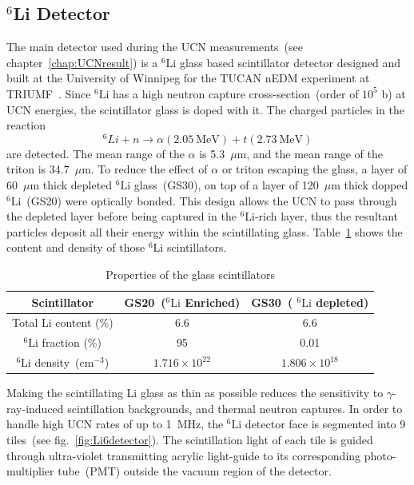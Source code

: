 \subsection{$^6$Li Detector\label{sec:Li6detector}}
The main detector used during the UCN measurements~(see
chapter~\ref{chap:UCNresult}) is a $^6\mathrm{Li}$ glass based
scintillator detector designed and built at the University of Winnipeg
for the TUCAN nEDM experiment at
TRIUMF~\cite{jamieson2017characterization, Lori}. Since
$^6\mathrm{Li}$ has a high neutron capture cross-section~(order of
$10^5$ b) at UCN energies, the scintillator glass is doped with
it. The charged particles in the reaction
\begin{equation}
^6Li + n \rightarrow \alpha (2.05~\mathrm{MeV}) + t (2.73~\mathrm{MeV})
\end{equation}
are detected. The mean range of the $\alpha$ is 5.3~$\mu$m, and the
mean range of the triton is 34.7~$\mu$m. To reduce the effect of
$\alpha$ or triton escaping the glass, a layer of 60~$\mu$m thick
depleted $^6\mathrm{Li}$ glass~(GS30), on top of a layer of 120~$\mu$m
thick dopped $^6\mathrm{Li}$~(GS20) were optically bonded. This design
allows the UCN to pass through the depleted layer before being
captured in the $^6$Li-rich layer, thus the resultant particles
deposit all their energy within the scintillating
glass. Table~\ref{tab:scintillator} shows the content and density of
those $^6\mathrm{Li}$ scintillators.

\begin{table}[h!]
  \centering
  \begin{tabular}{|c|c|c|}
    \hline
    Scintillator & GS20~($^6\mathrm{Li}$ Enriched) & GS30~( $^6\mathrm{Li}$ depleted) \\
    \hline
    Total Li content (\%) & 6.6 & 6.6 \\
    \hline
    $^6\mathrm{Li}$ fraction (\%) & 95 & 0.01 \\
    \hline
    $^6\mathrm{Li}$ density~(cm$^{-3}$) & $1.716 \times 10^{22}$ & $1.806 \times 10^{18}$ \\
    \hline
  \end{tabular}
  \caption{Properties of the glass
    scintillators\label{tab:scintillator}}
\end{table}


Making the scintillating Li glass as thin as possible reduces the
sensitivity to $\gamma$-ray-induced scintillation backgrounds, and
thermal neutron captures. In order to handle high UCN rates of up to
1~MHz, the $^6\mathrm{Li}$ detector face is segmented into 9
tiles~(see fig.~\ref{fig:Li6detector}). The scintillation light of
each tile is guided through ultra-violet transmitting acrylic
light-guide to its corresponding photo-multiplier tube~(PMT) outside
the vacuum region of the detector.

